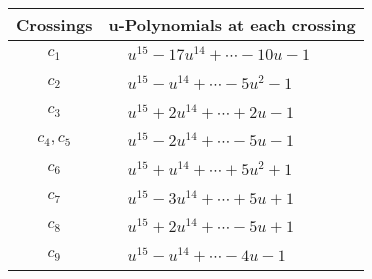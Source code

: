 \documentclass[1p]{elsarticle_modified}
\theoremstyle{definition}
\begin{document}
\begin{tabular}{m{50pt}|m{274pt}}
Crossings & \hspace{64pt}u-Polynomials at each crossing \\
\hline $$\begin{aligned}c_{1}\end{aligned}$$&$\begin{aligned}
&u^{15}-17 u^{14}+\cdots-10 u-1
\end{aligned}$\\
\hline $$\begin{aligned}c_{2}\end{aligned}$$&$\begin{aligned}
&u^{15}- u^{14}+\cdots-5 u^2-1
\end{aligned}$\\
\hline $$\begin{aligned}c_{3}\end{aligned}$$&$\begin{aligned}
&u^{15}+2 u^{14}+\cdots+2 u-1
\end{aligned}$\\
\hline $$\begin{aligned}c_{4},c_{5}\end{aligned}$$&$\begin{aligned}
&u^{15}-2 u^{14}+\cdots-5 u-1
\end{aligned}$\\
\hline $$\begin{aligned}c_{6}\end{aligned}$$&$\begin{aligned}
&u^{15}+u^{14}+\cdots+5 u^2+1
\end{aligned}$\\
\hline $$\begin{aligned}c_{7}\end{aligned}$$&$\begin{aligned}
&u^{15}-3 u^{14}+\cdots+5 u+1
\end{aligned}$\\
\hline $$\begin{aligned}c_{8}\end{aligned}$$&$\begin{aligned}
&u^{15}+2 u^{14}+\cdots-5 u+1
\end{aligned}$\\
\hline $$\begin{aligned}c_{9}\end{aligned}$$&$\begin{aligned}
&u^{15}- u^{14}+\cdots-4 u-1
\end{aligned}$\\

\end{tabular}
\end{document}
